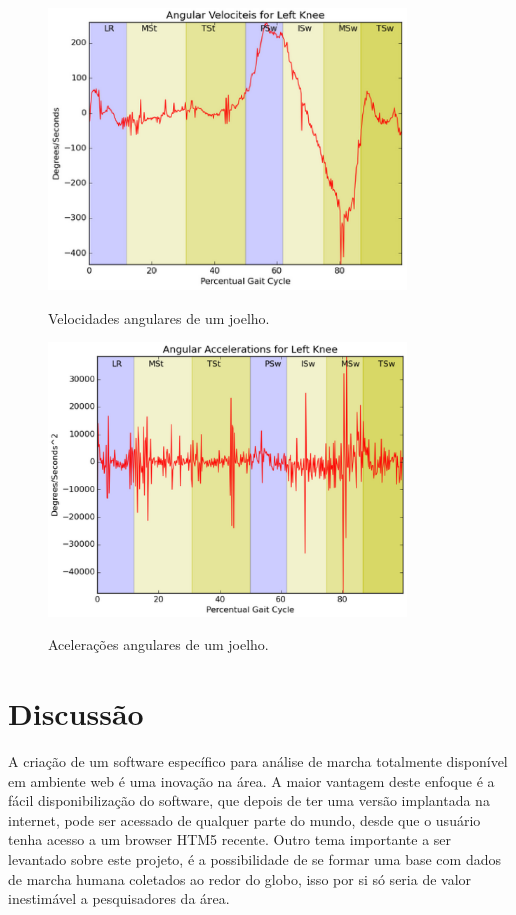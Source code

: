 \documentclass[journal]{IEEEtran}
\begin{document}
\begin{figure}[!t]
	\centering
	{\includegraphics[width=9.5cm]{tela26}}
	\caption{Velocidades angulares de um joelho. }
	\label{va}
\end{figure}

\begin{figure}[!t]
	\centering
	{\includegraphics[width=9.5cm]{angular_accelerations}}
	\caption{Acelerações angulares de um joelho.}
	\label{angular_accelerations}
\end{figure}

\section{Discussão}

A criação de um software específico para análise de marcha totalmente disponível em ambiente web é
uma inovação na área. A maior vantagem deste enfoque é a fácil disponibilização do software,
que depois de ter uma versão implantada na internet, pode ser acessado de qualquer parte do mundo,
desde que o usuário tenha acesso a um browser HTM5 recente.
Outro tema importante a ser levantado sobre este projeto, é a possibilidade de se formar uma base
com dados de marcha humana coletados ao redor do globo, isso por si só seria de valor inestimável
a pesquisadores da área.
\end{document}
